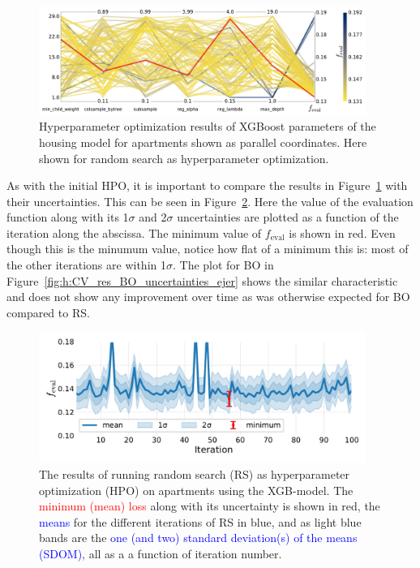 \begin{figure}
  \includegraphics[width=0.95\textwidth, trim=0 0 0 0, clip]{figures/housing/Ejerlejlighed_v19_cut_all_Ncols_all_CV_viz_HPO_RS.pdf}
  \caption[XXX]
          {Hyperparameter optimization results of XGBoost parameters of the housing model for apartments shown as parallel coordinates. Here shown for random search as hyperparameter optimization.
          } 
  \label{fig:h:CV_res_RS_parallel_coords_ejer}
\end{figure}

As with the initial HPO, it is important to compare the results in Figure~\ref{fig:h:CV_res_RS_parallel_coords_ejer} with their uncertainties. This can be seen in Figure~\ref{fig:h:CV_res_RS_uncertainties_ejer}. Here the value of the evaluation function along with its \num{1}$\sigma$  and \num{2}$\sigma$ uncertainties are plotted as a function of the iteration along the abscissa. The minimum value of $f_\mathrm{eval}$ is shown in red. Even though this is the minumum value, notice how flat of a minimum this is: most of the other iterations are within \num{1}$\sigma$. The plot for BO in Figure~\ref{fig:h:CV_res_BO_uncertainties_ejer} shows the similar characteristic and does not show any improvement over time as was otherwise expected for BO compared to RS. 

\begin{figure}
  \includegraphics[width=0.95\textwidth, trim=0 0 0 0, clip]{figures/housing/Ejerlejlighed_v19_cut_all_Ncols_all_xgb_score_over_time_random.pdf}
  \caption[Hyperparameter optimization: random search results]
          {The results of running random search (RS) as hyperparameter optimization (HPO) on apartments using the XGB-model. The \textcolor{red}{minimum (mean) loss} along with its uncertainty is shown in red, the \textcolor{blue}{means} for the different iterations of RS in blue, and as light blue bands are the \textcolor{blue}{one (and two) standard deviation(s) of the means (SDOM)}, all as a a function of iteration number.} 
  \label{fig:h:CV_res_RS_uncertainties_ejer}
\end{figure}


